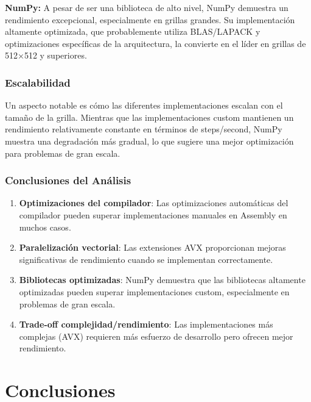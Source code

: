 \documentclass[a4paper]{article}
\begin{document}
\textbf{NumPy:} A pesar de ser una biblioteca de alto nivel, NumPy demuestra un rendimiento excepcional, especialmente en grillas grandes. Su implementación altamente optimizada, que probablemente utiliza BLAS/LAPACK y optimizaciones específicas de la arquitectura, la convierte en el líder en grillas de 512×512 y superiores.

\subsubsection{Escalabilidad}

Un aspecto notable es cómo las diferentes implementaciones escalan con el tamaño de la grilla. Mientras que las implementaciones custom mantienen un rendimiento relativamente constante en términos de steps/second, NumPy muestra una degradación más gradual, lo que sugiere una mejor optimización para problemas de gran escala.

\subsubsection{Conclusiones del Análisis}

\begin{enumerate}
    \item \textbf{Optimizaciones del compilador}: Las optimizaciones automáticas del compilador pueden superar implementaciones manuales en Assembly en muchos casos.
    \item \textbf{Paralelización vectorial}: Las extensiones AVX proporcionan mejoras significativas de rendimiento cuando se implementan correctamente.
    \item \textbf{Bibliotecas optimizadas}: NumPy demuestra que las bibliotecas altamente optimizadas pueden superar implementaciones custom, especialmente en problemas de gran escala.
    \item \textbf{Trade-off complejidad/rendimiento}: Las implementaciones más complejas (AVX) requieren más esfuerzo de desarrollo pero ofrecen mejor rendimiento.
\end{enumerate}

\section{Conclusiones}
\end{document}
